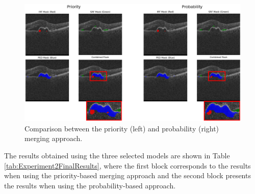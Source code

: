 \begin{figure}[!ht]
	\centering
	\includegraphics[width=1.0\linewidth]{figures/ProbabilityVsPrioritySegmentation.png}
	\caption{Comparison between the priority (left) and probability (right) merging approach.}
	\label{fig:ProbabilityVsPrioritySegmentation}
\end{figure}

The results obtained using the three selected models are shown in Table \ref{tab:Experiment2FinalResults}, where the first block corresponds to the results when using the priority-based merging approach and the second block presents the results when using the probability-based approach.


